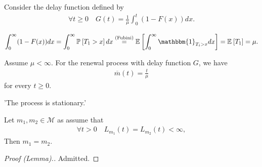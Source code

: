 \begin{defn}
	Consider the delay function defined by
	\begin{align}
		\forall t\geq 0 \quad G(t) = \frac{1}{\mu } \int_{0}^{t} (1-F(x))dx.
	\end{align}
\end{defn}
\begin{rmk}[]
	\begin{align}
		\int_{0}^{\infty} (1 - F(x)) dx = \int_{0}^{\infty} \mathbb{P}_{} \left[ T_1 > x \right] dx \stackrel{\textrm{(Fubini)}}{=} \mathbb{E}_{} \left[ \int_{0}^{\infty} \mathbbm{1}_{T_i > x} dx \right]  = \mathbb{E}_{} \left[ T_1 \right] = \mu .
	\end{align}
\end{rmk}

\begin{theorem}[]
	Assume $\mu <\infty$. For the renewal process with delay function $G$, we have
	\begin{align}
		\boxed{		\overline{m}(t) = \frac{t}{\mu }}
	\end{align}
	for every $t\geq 0$.
\end{theorem}
'The process is stationary.'
\begin{lemma}[]
	Let $m_1, m_2 \in \mathcal{M}$ as assume that
	\begin{align}
		\forall t>0 \quad L_{m_1}(t) = L_{m_2}(t) < \infty,
	\end{align}
Then $m_1 = m_2$.	
\end{lemma}
\begin{proof}[Proof (Lemma).]
	Admitted.
\end{proof}

